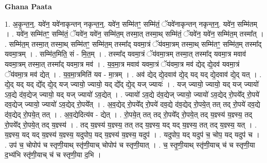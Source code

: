 \documentclass[17pt]{extarticle}
\begin{document}
\textbf{Ghana Paata } \newline

1. अ॒कृ॒न्त॒न्॒. यवे॑न॒ यवे॑नाकृन्तन् नकृन्त॒न्॒. यवे॑न॒ सम्मि॑तꣳ॒॒ सम्मि॑तं॒ ॅयवे॑नाकृन्तन् नकृन्त॒न्॒. यवे॑न॒ सम्मि॑तम् । . यवे॑न॒ सम्मि॑तꣳ॒॒ सम्मि॑तं॒ ॅयवे॑न॒ यवे॑न॒ सम्मि॑त॒म् तस्मा॒त् तस्मा॒थ् सम्मि॑तं॒ ॅयवे॑न॒ यवे॑न॒ सम्मि॑त॒म् तस्मा᳚त् । . सम्मि॑त॒म् तस्मा॒त् तस्मा॒थ् सम्मि॑तꣳ॒॒ सम्मि॑त॒म् तस्मा᳚द् यवमा॒त्रं ॅय॑वमा॒त्रम् तस्मा॒थ् सम्मि॑तꣳ॒॒ सम्मि॑त॒म् तस्मा᳚द् यवमा॒त्रम् । . सम्मि॑त॒मिति॒ सं - मि॒त॒म् । . तस्मा᳚द् यवमा॒त्रं ॅय॑वमा॒त्रम् तस्मा॒त् तस्मा᳚द् यवमा॒त्र मवाव॑ यवमा॒त्रम् तस्मा॒त् तस्मा᳚द् यवमा॒त्र मव॑ । . य॒व॒मा॒त्र मवाव॑ यवमा॒त्रं ॅय॑वमा॒त्र मव॑ द्येद् द्ये॒दव॑ यवमा॒त्रं ॅय॑वमा॒त्र मव॑ द्येत् । . य॒व॒मा॒त्रमिति॑ यव - मा॒त्रम् । . अव॑ द्येद् द्ये॒दवाव॑ द्ये॒द् यद् यद् द्ये॒दवाव॑ द्ये॒द् यत् । . द्ये॒द् यद् यद् द्ये᳚द् द्ये॒द् यज् ज्यायो॒ ज्यायो॒ यद् द्ये᳚द् द्ये॒द् यज् ज्यायः॑ । . यज् ज्यायो॒ ज्यायो॒ यद् यज् ज्यायो॑ ऽव॒द्ये द॑व॒द्येज् ज्यायो॒ यद् यज् ज्यायो॑ ऽव॒द्येत् । . ज्यायो॑ ऽव॒द्ये द॑व॒द्येज् ज्यायो॒ ज्यायो॑ ऽव॒द्येद् रो॒पये᳚द् रो॒पये॑ दव॒द्येज् ज्यायो॒ ज्यायो॑ ऽव॒द्येद् रो॒पये᳚त् । . अ॒व॒द्येद् रो॒पये᳚द् रो॒पये॑ दव॒द्ये द॑व॒द्येद् रो॒पये॒त् तत् तद् रो॒पये॑ दव॒द्ये द॑व॒द्येद् रो॒पये॒त् तत् । . अ॒व॒द्येदित्य॑व - द्येत् । . रो॒पये॒त् तत् तद् रो॒पये᳚द् रो॒पये॒त् तद् य॒ज्ञ्स्य॑ य॒ज्ञ्स्य॒ तद् रो॒पये᳚द् रो॒पये॒त् तद् य॒ज्ञ्स्य॑ । . तद् य॒ज्ञ्स्य॑ य॒ज्ञ्स्य॒ तत् तद् य॒ज्ञ्स्य॒ यद् यद् य॒ज्ञ्स्य॒ तत् तद् य॒ज्ञ्स्य॒ यत् । . य॒ज्ञ्स्य॒ यद् यद् य॒ज्ञ्स्य॑ य॒ज्ञ्स्य॒ यदुपोप॒ यद् य॒ज्ञ्स्य॑ य॒ज्ञ्स्य॒ यदुप॑ । . यदुपोप॒ यद् यदुप॑ च॒ चोप॒ यद् यदुप॑ च । . उप॑ च॒ चोपोप॑ च स्तृणी॒याथ् स्तृ॑णी॒याच् चोपोप॑ च स्तृणी॒यात् । . च॒ स्तृ॒णी॒याथ् स्तृ॑णी॒याच् च॑ च स्तृणी॒या द॒भ्य॑भि स्तृ॑णी॒याच् च॑ च स्तृणी॒या द॒भि । \newline
\end{document}
